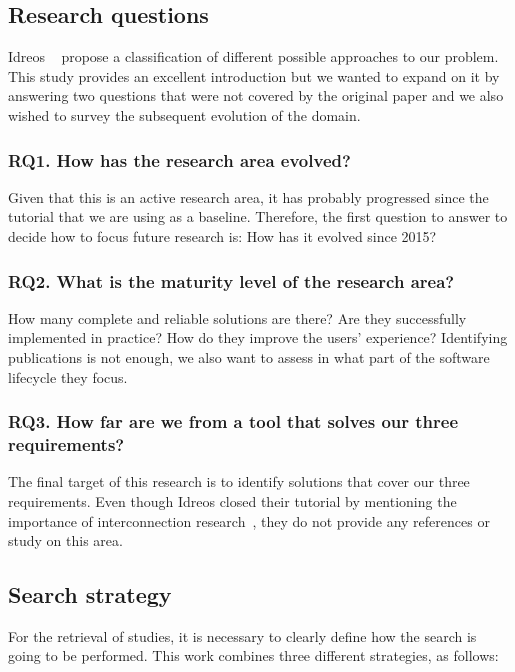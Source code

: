 \subsection{Research questions}
\label{sec:mapping/research_questions}

Idreos \etal~\cite{Idreos2015} propose a classification of different possible approaches
to our problem.
This study provides an excellent introduction but we wanted to expand on it by answering
two questions that were not covered by the original paper and we also wished to survey
the subsequent evolution of the domain.

\subsubsection{RQ1. How has the research area evolved?}
Given that this is an active research area, it has probably progressed since
the tutorial that we are using as a baseline. Therefore, the first
question to answer to decide how to focus future research is:
How has it evolved since 2015?

\subsubsection{RQ2. What is the maturity level of the research area?}
How many complete and reliable solutions are there?
Are they successfully implemented in practice?
How do they improve the users' experience? Identifying publications is not enough,
we also want to assess in what part of the software lifecycle they focus.

\subsubsection{RQ3. How far are we from a tool that solves our three requirements?}
The final target of this research is to identify solutions that cover our three
requirements.
Even though Idreos closed their tutorial by
mentioning the importance of interconnection research~\cite{Idreos2015}, they do not provide
any references or study on this area.

\subsection{Search strategy}
\label{sec:mapping/search_strategy}

For the retrieval of studies, it is necessary to clearly define
how the search is going to be performed. This work combines
three different strategies, as follows:

